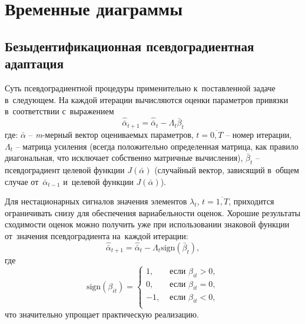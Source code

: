 \chapter{Временные диаграммы}
\section{Безыдентификационная псевдоградиентная адаптация}
Суть псевдоградиентной процедуры применительно к~поставленной задаче в~следующем. На каждой итерации вычисляются оценки параметров привязки в~соответствии с~выражением
\[
\hat{\bar{\alpha}}_{t+1}=\hat{\bar{\alpha}}_{t}-\Lambda_{t}\bar{\beta}_{t}
\]
где: $\bar{\alpha}$ -- \textit{m}-мерный вектор оцениваемых параметров, $t=\overline{0,T}$ -- номер итерации, $\Lambda_{t}$ -- матрица усиления (всегда положительно определенная матрица, как правило диагональная, что исключает собственно матричные вычисления), $\bar{\beta}_{t}$ -- псевдоградиент целевой функции $J(\bar{\alpha})$ (случайный вектор, зависящий в~общем случае от~$\bar{\alpha}_{t-1}$ и~целевой функции $J(\bar{\alpha})$).

Для нестационарных сигналов значения элементов $\lambda_{t}$, $t=\overline{1,T}$, приходится ограничивать снизу для обеспечения вариабельности оценок. Хорошие результаты сходимости оценок можно получить уже при использовании знаковой функции от~значения псевдоградиента на~каждой итерации:
\[
\hat{\bar{\alpha}}_{t+1}=\hat{\bar{\alpha}}_{t}-\Lambda_{t}\text{sign}(\bar{\beta}_{t}),
\]
где
\[
\text{sign}(\beta_{it})= 
\left\{
	\begin{aligned}
		1, &\text{ если } \beta_{it} > 0, \\
		0, &\text{ если } \beta_{it} = 0, \\
		-1, &\text{ если } \beta_{it} < 0, \\
	\end{aligned}
\right.
\]
что значительно упрощает практическую реализацию. 